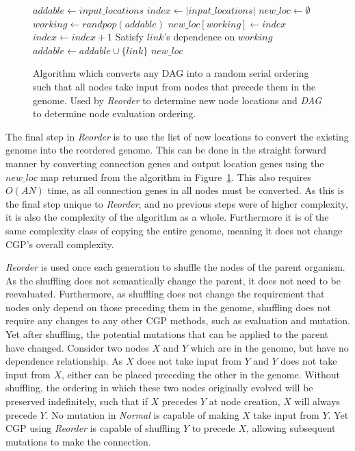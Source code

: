 \documentclass[journal]{IEEEtran}
\begin{document}
\begin{figure}
  \begin{algorithmic}
    \State $addable \leftarrow input\_locations$
    \State $index \leftarrow |input\_locations|$
    \State $new\_loc \leftarrow \emptyset$
      \State $working \leftarrow randpop(addable)$
        \State $new\_loc[working] \leftarrow index$
        \State $index \leftarrow index + 1$
      \EndIf
        \State Satisfy $link$'s dependence on $working$
          \State $addable \leftarrow addable \cup \{link\}$
        \EndIf
      \EndFor
    \EndWhile
    \State\Return $new\_loc$
    \EndProcedure
  \end{algorithmic}
  \caption{Algorithm which converts any DAG into a random serial ordering such
           that all nodes take input from nodes that precede them in the genome.
           Used by \emph{Reorder} to determine new node locations and \emph{DAG} to
           determine node evaluation ordering.}
  \label{fig:reorder}
\end{figure}

The final step in \emph{Reorder} is to use the list of new locations to convert
the existing genome into the reordered genome.  This can be done in the straight
forward manner by converting connection genes and output location genes using
the $new\_loc$ map returned from the algorithm in Figure~\ref{fig:reorder}.
This also requires $O(AN)$ time, as all connection genes in all nodes must
be converted.  As this is the final step unique to \emph{Reorder}, and
no previous steps were of higher complexity, it is also the complexity of
the algorithm as a whole.  Furthermore it is of the same complexity class
of copying the entire genome, meaning it does not change CGP's overall complexity.

\emph{Reorder} is used once each generation to shuffle the nodes of the parent
organism.  As the shuffling does not semantically change the parent, it does
not need to be reevaluated.  Furthermore, as shuffling does not change the requirement
that nodes only depend on those preceding them in the genome, shuffling does not
require any changes to any other CGP methods, such as evaluation and mutation.
Yet after shuffling, the potential mutations that can be applied to the parent
have changed.  Consider two nodes $X$ and $Y$ which are in the genome, but
have no dependence relationship.  As $X$ does not take input from $Y$ and
$Y$ does not take input from $X$, either can be placed preceding the other
in the genome.  Without shuffling, the ordering in which these two nodes originally
evolved will be preserved indefinitely, such that if $X$ precedes $Y$ at node creation,
$X$ will always precede $Y$.  No mutation in \emph{Normal} is capable of making $X$
take input from $Y$.  Yet CGP using \emph{Reorder} is capable of shuffling $Y$ to
precede $X$, allowing subsequent mutations to make the connection.
\end{document}

